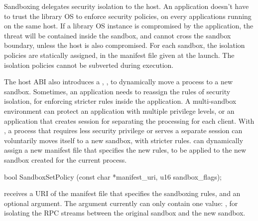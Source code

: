 Sandboxing delegates
security isolation to the host.
An application doesn't have to trust the library OS
to enforce security policies,
on every applications running on the same host.
If a library OS instance is compromised by the application,
the threat will be contained inside the sandbox,
and cannot cross the sandbox boundary, unless the host is also compromised.
For each sandbox,
the isolation policies are statically assigned,
in the manifest file given at the launch.
The isolation policies
cannot be subverted during execution.



The host ABI also introduces a \hostapi{}, ,
to dynamically move a process to a new sandbox.
Sometimes, an application needs to reassign the rules of security isolation,
for enforcing stricter rules inside the application.
A multi-sandbox environment can protect an application with multiple privilege levels, or an application that creates session for separating the processing for each client.
With , a process that requires less security privilege
or serves a separate session can voluntarily moves itself to a new sandbox,
with stricter rules.
 can dynamically
assign a new manifest file that specifies the new rules,
to be applied to the
new sandbox created for the current process.







\begin{paldef}
bool SandboxSetPolicy (const char *manifest_uri,
                       u16 sandbox_flags);
\end{paldef}


 receives a URI of the manifest file that specifies the sandboxing rules,
and an optional  argument.
The  argument currently can only contain one value:
, for isolating the RPC streams between the original sandbox and the new sandbox.
